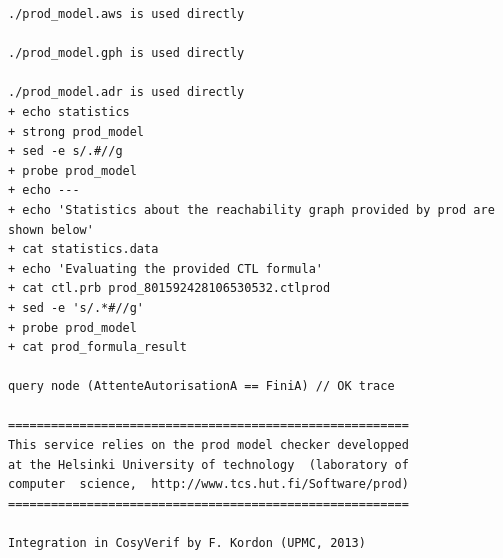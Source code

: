 \documentclass[a4paper,11pt]{report}
\begin{document}
\begin{verbatim}
./prod_model.aws is used directly

./prod_model.gph is used directly

./prod_model.adr is used directly
+ echo statistics
+ strong prod_model
+ sed -e s/.#//g
+ probe prod_model
+ echo ---
+ echo 'Statistics about the reachability graph provided by prod are shown below'
+ cat statistics.data
+ echo 'Evaluating the provided CTL formula'
+ cat ctl.prb prod_801592428106530532.ctlprod
+ sed -e 's/.*#//g'
+ probe prod_model
+ cat prod_formula_result

query node (AttenteAutorisationA == FiniA) // OK trace

========================================================
This service relies on the prod model checker developped
at the Helsinki University of technology  (laboratory of
computer  science,  http://www.tcs.hut.fi/Software/prod)
========================================================

Integration in CosyVerif by F. Kordon (UPMC, 2013)


\end{verbatim}
\end{document}
